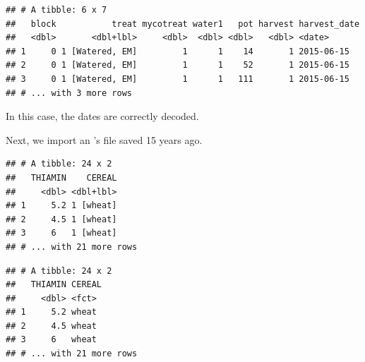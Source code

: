\documentclass[krantz2]{krantz}\usepackage{knitr}
\begin{document}
\begin{knitrout}\footnotesize
{}\color{fgcolor}\begin{kframe}
\begin{alltt}
 \hlkwb{<-} \hlstd{(} \hlstd{=} \hlstd{)}
\hlstd{my_spss.tb[}\hlopt{:}\hlstd{,} \hlstd{(}\hlopt{:}\hlstd{,} \hlstd{)]}
\end{alltt}
\begin{verbatim}
## # A tibble: 6 x 7
##   block           treat mycotreat water1   pot harvest harvest_date
##   <dbl>       <dbl+lbl>     <dbl>  <dbl> <dbl>   <dbl> <date>      
## 1     0 1 [Watered, EM]         1      1    14       1 2015-06-15  
## 2     0 1 [Watered, EM]         1      1    52       1 2015-06-15  
## 3     0 1 [Watered, EM]         1      1   111       1 2015-06-15  
## # ... with 3 more rows
\end{verbatim}
\end{kframe}
\end{knitrout}

In this case, the dates are correctly decoded.

Next, we import an 's  file saved 15 years ago.

\begin{knitrout}\footnotesize
{}\color{fgcolor}\begin{kframe}
\begin{alltt}
 \hlkwb{<-} \hlstd{(} \hlstd{=} \hlstd{)}
\end{alltt}
\begin{verbatim}
## # A tibble: 24 x 2
##   THIAMIN    CEREAL
##     <dbl> <dbl+lbl>
## 1     5.2 1 [wheat]
## 2     4.5 1 [wheat]
## 3     6   1 [wheat]
## # ... with 21 more rows
\end{verbatim}
\begin{alltt}
 \hlkwb{<-} 
\end{alltt}
\begin{verbatim}
## # A tibble: 24 x 2
##   THIAMIN CEREAL
##     <dbl> <fct> 
## 1     5.2 wheat 
## 2     4.5 wheat 
## 3     6   wheat 
## # ... with 21 more rows
\end{verbatim}
\end{kframe}
\end{knitrout}
\end{document}
